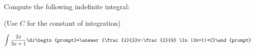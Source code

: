 \documentclass{ximera}
\author{Jim Talamo}
\begin{document}
\begin{exercise}
Compute the following indefinite integral:

\begin{prompt} (Use $C$ for the constant of integration) \end{prompt}

\[
\int \frac{2x}{3x+1} \d x 
\begin{prompt}=\answer{\frac{2}{3}x-\frac{2}{9} \ln|3x+1|+C}\end{prompt}
\]
\end{exercise}
\end{document}
